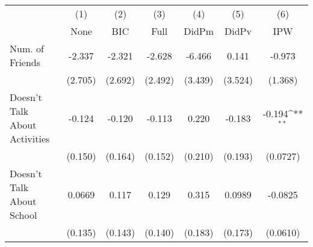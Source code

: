 {
\def\sym#1{\ifmmode^{#1}\else\(^{#1}\)\fi}
\begin{tabular}{l*{6}{c}}
\toprule
            &\multicolumn{1}{c}{(1)}&\multicolumn{1}{c}{(2)}&\multicolumn{1}{c}{(3)}&\multicolumn{1}{c}{(4)}&\multicolumn{1}{c}{(5)}&\multicolumn{1}{c}{(6)}\\
            &\multicolumn{1}{c}{None}&\multicolumn{1}{c}{BIC}&\multicolumn{1}{c}{Full}&\multicolumn{1}{c}{DidPm}&\multicolumn{1}{c}{DidPv}&\multicolumn{1}{c}{IPW}\\
\midrule
Num. of Friends&      -2.337         &      -2.321         &      -2.628         &      -6.466         &       0.141         &      -0.973         \\
            &     (2.705)         &     (2.692)         &     (2.492)         &     (3.439)         &     (3.524)         &     (1.368)         \\
\addlinespace
Doesn't Talk About Activities&      -0.124         &      -0.120         &      -0.113         &       0.220         &      -0.183         &      -0.194\sym{**} \\
            &     (0.150)         &     (0.164)         &     (0.152)         &     (0.210)         &     (0.193)         &    (0.0727)         \\
\addlinespace
Doesn't Talk About School&      0.0669         &       0.117         &       0.129         &       0.315         &      0.0989         &     -0.0825         \\
            &     (0.135)         &     (0.143)         &     (0.140)         &     (0.183)         &     (0.173)         &    (0.0610)         \\
\bottomrule
\end{tabular}
}
